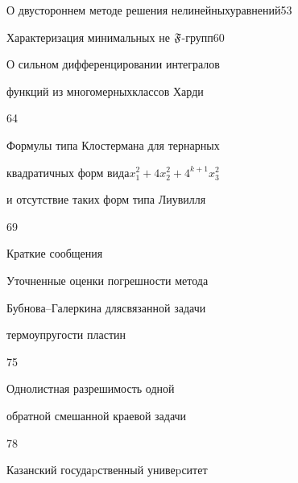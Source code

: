 





{О двустороннем методе решения нелинейных\newline уравнений}{53}




{Характеризация минимальных не $\frak F$-групп}{60}




{О сильном дифференцировании интегралов 


функций из многомерных\newline классов Харди}{64}




{Формулы типа Клостермана для тернарных 


квадратичных форм вида\newline $x^2_1+4x^2_2+4^{k+1}x^2_3$ 


и отсутствие таких форм типа Лиувилля}{69}





\bigskip


{\centerline {Краткие сообщения}}


\bigskip







{Уточненные оценки погрешности метода 


Бубнова--Галеркина для\newline связанной задачи 


термоупругости пластин}{75}




{Однолистная разрешимость одной \newline


обратной смешанной краевой задачи}{78}








\vfill


\noindent\raisebox{2pt}{\copyright} Казанский госудаpственный унивеpситет





